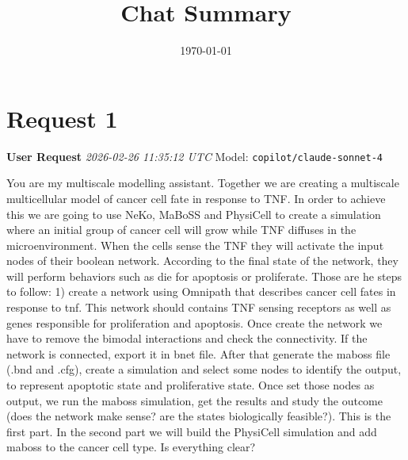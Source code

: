 \documentclass[11pt,a4paper]{article}
\title{Chat Summary}
\date{\today}
\begin{document}
\maketitle
\tableofcontents
\newpage

\section{Request 1}
\begin{userbox}
\textbf{User Request}
\quad \textit{2026-02-26 11:35:12 UTC}
\quad Model: \texttt{copilot/claude-sonnet-4}

You are my multiscale modelling assistant. Together we are creating a multiscale multicellular model of cancer cell fate in response to TNF. In order to achieve this we are going to use NeKo, MaBoSS and PhysiCell to create a simulation where an initial group of cancer cell will grow while TNF diffuses in the microenvironment. When the cells sense the TNF they will activate the input nodes of their boolean network. According to the final state of the network, they will perform behaviors such as die for apoptosis or proliferate. Those are he steps to follow: 1) create a network using Omnipath that describes cancer cell fates in response to tnf. This network should contains TNF sensing receptors as well as genes responsible for proliferation and apoptosis. Once create the network we have to remove the bimodal interactions and check the connectivity. If the network is connected, export it in bnet file. After that generate the maboss file (.bnd and .cfg), create a simulation and select some nodes to identify the output, to represent apoptotic state and proliferative state. Once set those nodes as output, we run the maboss simulation, get the results and study the outcome (does the network make
sense? are the states biologically feasible?). This is the first part. In the second part we will build the PhysiCell simulation and add maboss to the cancer cell type. Is everything clear?

\end{userbox}
\end{document}
